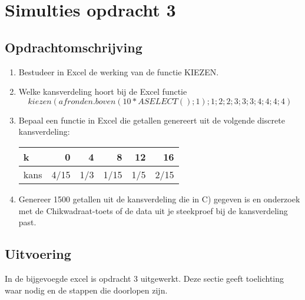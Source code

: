 \documentclass{article}
\begin{document}



\section{Simulties opdracht 3}
\label{sec:sample_main}

\subsection{Opdrachtomschrijving}
\label{subsec:sample_opdrom}

\begin{enumerate}[label=(\Alph*)]

\item Bestudeer in Excel de werking van de functie KIEZEN. 
\item Welke kansverdeling hoort bij de Excel functie 
  \begin{equation}kiezen(afronden.boven(10*ASELECT();1);1;2;2;3;3;3;4;4;4;4)\end{equation}
\item Bepaal een functie in Excel die getallen genereert uit de volgende discrete kansverdeling:

\begin{table}[h]
  \begin{tabular}{|l|r|r|r|r|r|}
      \hline
      k & 0 & 4 & 8 & 12 & 16 \\ \hline
      kans & 4/15 & 1/3 & 1/15 & 1/5 & 2/15 \\ 
      \hline
  \end{tabular}
\end{table}

\item Genereer 1500 getallen uit de kansverdeling die in C) gegeven is en onderzoek met de Chikwadraat-toets of de data uit je steekproef bij de kansverdeling past. 

\end{enumerate}

\newpage
\subsection{Uitvoering}
\label{subsec:sample_uitv}

In de bijgevoegde excel is opdracht 3 uitgewerkt. Deze sectie geeft toelichting waar nodig en de stappen die doorlopen zijn.
\end{document}

